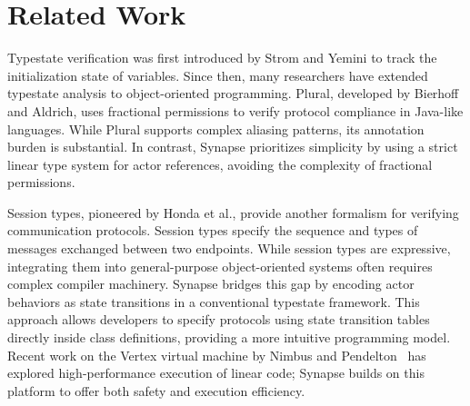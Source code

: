 \section{Related Work}
Typestate verification was first introduced by Strom and Yemini to track the initialization state of variables. Since then, many researchers have extended typestate analysis to object-oriented programming. Plural, developed by Bierhoff and Aldrich, uses fractional permissions to verify protocol compliance in Java-like languages. While Plural supports complex aliasing patterns, its annotation burden is substantial. In contrast, Synapse prioritizes simplicity by using a strict linear type system for actor references, avoiding the complexity of fractional permissions.

Session types, pioneered by Honda et al., provide another formalism for verifying communication protocols. Session types specify the sequence and types of messages exchanged between two endpoints. While session types are expressive, integrating them into general-purpose object-oriented systems often requires complex compiler machinery. Synapse bridges this gap by encoding actor behaviors as state transitions in a conventional typestate framework. This approach allows developers to specify protocols using state transition tables directly inside class definitions, providing a more intuitive programming model. Recent work on the Vertex virtual machine by Nimbus and Pendelton~\cite{nimbus2019vertex} has explored high-performance execution of linear code; Synapse builds on this platform to offer both safety and execution efficiency.
